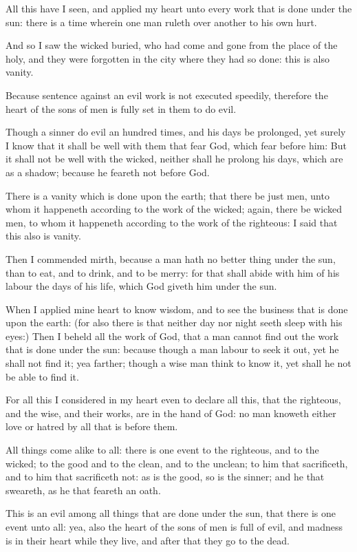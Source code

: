 \Verse All this have I seen, and applied my heart unto every work that is done under the sun: there is a time wherein one man ruleth over another to his own hurt.

\Verse And so I saw the wicked buried, who had come and gone from the place of the holy, and they were forgotten in the city where they had so done: this is also vanity.

\Verse Because sentence against an evil work is not executed speedily, therefore the heart of the sons of men is fully set in them to do evil.

\Verse Though a sinner do evil an hundred times, and his days be prolonged, yet surely I know that it shall be well with them that fear God, which fear before him: \Verse But it shall not be well with the wicked, neither shall he prolong his days, which are as a shadow; because he feareth not before God.

\Verse There is a vanity which is done upon the earth; that there be just men, unto whom it happeneth according to the work of the wicked; again, there be wicked men, to whom it happeneth according to the work of the righteous: I said that this also is vanity.

\Verse Then I commended mirth, because a man hath no better thing under the sun, than to eat, and to drink, and to be merry: for that shall abide with him of his labour the days of his life, which God giveth him under the sun.

\Verse When I applied mine heart to know wisdom, and to see the business that is done upon the earth: (for also there is that neither day nor night seeth sleep with his eyes:) \Verse Then I beheld all the work of God, that a man cannot find out the work that is done under the sun: because though a man labour to seek it out, yet he shall not find it; yea farther; though a wise man think to know it, yet shall he not be able to find it.


\Chapter
\Verse For all this I considered in my heart even to declare all this, that the righteous, and the wise, and their works, are in the hand of God: no man knoweth either love or hatred by all that is before them.

\Verse All things come alike to all: there is one event to the righteous, and to the wicked; to the good and to the clean, and to the unclean; to him that sacrificeth, and to him that sacrificeth not: as is the good, so is the sinner; and he that sweareth, as he that feareth an oath.

\Verse This is an evil among all things that are done under the sun, that there is one event unto all: yea, also the heart of the sons of men is full of evil, and madness is in their heart while they live, and after that they go to the dead.

